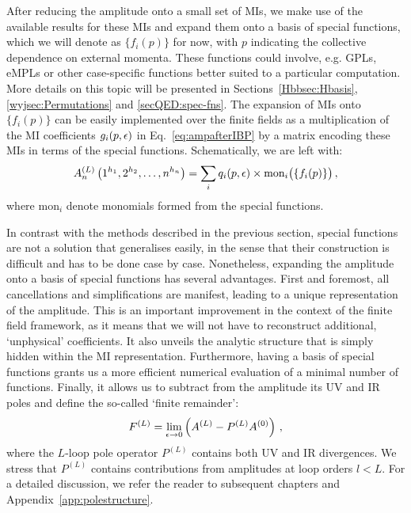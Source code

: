 \documentclass[main.tex]{subfiles}
\begin{document}
After reducing the amplitude onto a small set of MIs, we make use of the available results for these MIs and expand them onto a basis of special functions, which we will denote as $\{f_i(p)\}$ for now, with $p$ indicating the collective dependence on external momenta. These functions could involve, e.g. GPLs, eMPLs or other case-specific functions better suited to a particular computation. More details on this topic will be presented in Sections~\ref{Hbbsec:Hbasis}, \ref{wyjsec:Permutations} and \ref{secQED:spec-fns}. The expansion of MIs onto $\{f_i(p)\}$ can be easily implemented over the finite fields as a multiplication of the MI coefficients $g_i(p, \epsilon)$ in Eq.~\ref{eq:ampafterIBP} by a matrix encoding these MIs in terms of the special functions. Schematically, we are left with:
\begin{equation} \label{eq:ampexpandedspfuncs}
    A_n^{(L)} \left(1^{h_1}, 2^{h_2}, \ldots, n^{h_n} \right) = \sum_i q_i(p, \epsilon) \times \text{mon}_i \big(\{f_i(p)\}\big)\,,
\end{equation}
where mon$_i$ denote monomials formed from the special functions.

In contrast with the methods described in the previous section, special functions are not a solution that generalises easily, in the sense that their construction is difficult and has to be done case by case. Nonetheless, expanding the amplitude onto a basis of special functions has several advantages. First and foremost, all cancellations and simplifications are manifest, leading to a unique representation of the amplitude. This is an important improvement in the context of the finite field framework, as it means that we will not have to reconstruct additional, `unphysical' coefficients. It also unveils the analytic structure that is simply hidden within the MI representation. Furthermore, having a basis of special functions grants us a more efficient numerical evaluation of a minimal number of functions. Finally, it allows us to subtract from the amplitude its UV and IR poles and define the so-called `finite remainder':
\begin{equation} \label{eq:finremschematic}
    F^{(L)} = \lim_{\epsilon \to 0} \left( A^{(L)} - P^{(L)} A^{(0)} \right)\,,
\end{equation}
where the $L$-loop pole operator $P^{(L)}$ contains both UV and IR divergences. We stress that $P^{(L)}$ contains contributions from amplitudes at loop orders $l<L$. For a detailed discussion, we refer the reader to subsequent chapters and Appendix~\ref{app:polestructure}.
\end{document}

